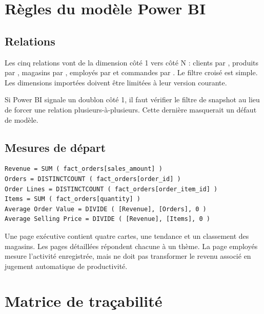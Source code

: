 \chapter{Règles du modèle Power BI}

\section{Relations}
Les cinq relations vont de la dimension côté 1 vers  côté N : clients par , produits par , magasins par , employés par  et commandes par . Le filtre croisé est simple. Les dimensions importées doivent être limitées à leur version courante.

Si Power BI signale un doublon côté 1, il faut vérifier le filtre de snapshot au lieu de forcer une relation plusieurs-à-plusieurs. Cette dernière masquerait un défaut de modèle.

\section{Mesures de départ}
\begin{lstlisting}[language={},caption={Mesures DAX recommandées}]
Revenue = SUM ( fact_orders[sales_amount] )
Orders = DISTINCTCOUNT ( fact_orders[order_id] )
Order Lines = DISTINCTCOUNT ( fact_orders[order_item_id] )
Items = SUM ( fact_orders[quantity] )
Average Order Value = DIVIDE ( [Revenue], [Orders], 0 )
Average Selling Price = DIVIDE ( [Revenue], [Items], 0 )
\end{lstlisting}

Une page exécutive contient quatre cartes, une tendance et un classement des magasins. Les pages détaillées répondent chacune à un thème. La page employés mesure l'activité enregistrée, mais ne doit pas transformer le revenu associé en jugement automatique de productivité.

\chapter{Matrice de traçabilité}

